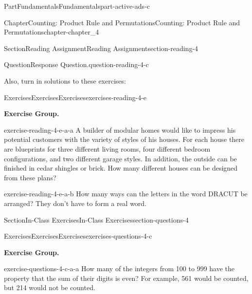 \documentclass[oneside,10pt,]{book}
\numberwithin{equation}{section}
\begin{document}
\begin{partptx}{Part}{Fundamentals}{}{Fundamentals}{}{}{part-active-ads-c}
\begin{chapterptx}{Chapter}{Counting: Product Rule and Permutations}{}{Counting: Product Rule and Permutations}{}{}{chapter-chapter_4}
\begin{sectionptx}{Section}{Reading Assignment}{}{Reading Assignment}{}{}{section-reading-4}
\begin{question}{Question}{Response Question.}{question-reading-4-c}
\end{question}
Also, turn in solutions to these exercises:%
%
%
\typeout{************************************************}
\typeout{************************************************}
%
\begin{exercises-subsection-numberless}{Exercises}{Exercises}{}{Exercises}{}{}{exercises-reading-4-e}
\par\medskip\noindent%
\textbf{Exercise Group.}\space\space%
\begin{exercisegroup}
\begin{divisionexerciseeg}{1}{}{}{exercise-reading-4-e-a-a}%
A builder of modular homes would like to impress his potential customers with the variety of styles of his houses. For each house there are blueprints for three different living rooms, four different bedroom configurations, and two different garage styles. In addition, the outside can be finished in cedar shingles or brick. How many different houses can be designed from these plans?%
\end{divisionexerciseeg}%
\begin{divisionexerciseeg}{2}{}{}{exercise-reading-4-e-a-b}%
How many ways can the letters in the word DRACUT be arranged? They don't have to form a real word.%
\end{divisionexerciseeg}%
\end{exercisegroup}
\par\medskip\noindent
\end{exercises-subsection-numberless}
\end{sectionptx}
%
%
\typeout{************************************************}
\typeout{************************************************}
%
\begin{sectionptx}{Section}{In-Class Exercises}{}{In-Class Exercises}{}{}{section-questions-4}
%
%
%
\typeout{************************************************}
\typeout{************************************************}
%
\begin{exercises-subsection-numberless}{Exercises}{Exercises}{}{Exercises}{}{}{exercises-questions-4-c}
\par\medskip\noindent%
\textbf{Exercise Group.}\space\space%
\begin{exercisegroup}
\begin{divisionexerciseeg}{1}{}{}{exercise-questions-4-c-a-a}%
How many of the integers from 100 to 999 have the property that the sum of their digits is even? For example, 561 would be counted, but 214 would not be counted.%

\end{divisionexerciseeg}
\end{exercisegroup}
\end{exercises-subsection-numberless}
\end{sectionptx}
\end{chapterptx}
\end{partptx}
\end{document}
